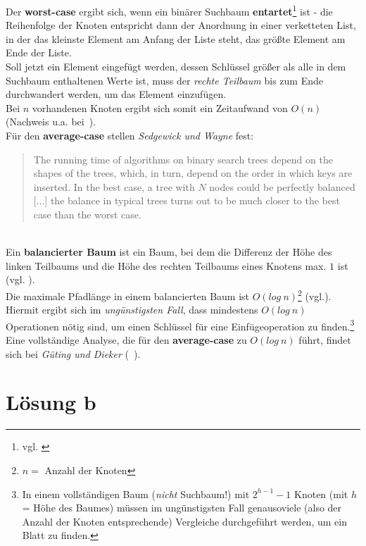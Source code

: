  \noindent
Der \textbf{worst-case} ergibt sich, wenn ein binärer Suchbaum \textbf{entartet}\footnote{
vgl. \cite[136]{GD18e}
} ist - die Reihenfolge der Knoten entspricht dann der Anordnung in einer verketteten List, in der das kleinste Element am Anfang der Liste steht, das größte Element am Ende der Liste.\\
Soll jetzt ein Element eingefügt werden, dessen Schlüssel größer als alle in dem Suchbaum enthaltenen Werte ist, muss der \textit{rechte Teilbaum} bis zum Ende durchwandert werden, um das Element einzufügen.\\
Bei $n$ vorhandenen Knoten ergibt sich somit ein Zeitaufwand von $O(n)$ (Nachweis u.a. bei~\cite[135 f.]{GD18d}).\\

\noindent
Für den \textbf{average-case} stellen \textit{Sedgewick und Wayne} fest:

\blockquote[{\cite[403]{SW11}}]{
The running time of algorithms on binary search trees depend on the shapes of the trees, which, in turn, depend on the order in which keys are inserted. In the best case, a tree with $N$ nodes could be perfectly balanced [...] the balance in typical trees turns out to be much closer to the best case than the worst case.
}\\

\noindent
Ein \textbf{balancierter Baum} ist ein Baum, bei dem die Differenz der Höhe des linken Teilbaums und die Höhe des rechten Teilbaums eines Knotens max. $1$ ist (vgl. \cite[284]{OW17e}).\\
Die maximale Pfadlänge in einem balancierten Baum ist $O(log\ n)$\footnote{$n=$ Anzahl der Knoten} (vgl.\cite[135]{GD18d}).\\
Hiermit ergibt sich im \textit{ungünstigsten Fall}, dass mindestens $O(log\ n)$ Operationen nötig sind, um einen Schlüssel für eine Einfügeoperation zu finden.\footnote{
In einem vollständigen Baum (\textit{nicht} Suchbaum!) mit $2^{h-1} - 1$ Knoten (mit $h$ = Höhe des Baumes) müssen im ungünstigsten Fall genausoviele (also der Anzahl der Knoten entsprechende) Vergleiche durchgeführt werden, um ein Blatt zu finden.
}\\
Eine vollständige Analyse, die für den \textbf{average-case} zu $O(log\ n)$ führt, findet sich bei \textit{Güting und Dieker} (~\cite[136 ff.]{GD18d}).




\section{Lösung b}

